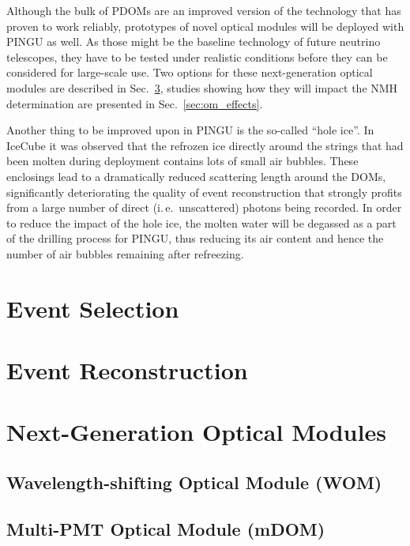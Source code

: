 Although the bulk of PDOMs are an improved version of the technology that has 
proven to work reliably, prototypes of novel optical modules will be deployed 
with PINGU as well. As those might be the baseline technology of future 
neutrino telescopes, they have to be tested under realistic conditions before 
they can be considered for large-scale use. Two options for these 
next-generation optical modules are described in Sec.~\ref{sec:Gen2DOM}, 
studies showing how they will impact the NMH determination are presented in 
Sec.~\ref{sec:om_effects}.

Another thing to be improved upon in PINGU is the so-called ``hole ice''. In 
IceCube it was observed that the refrozen ice directly around the strings that 
had been molten during deployment contains lots of small air bubbles. These 
enclosings 
lead to a dramatically reduced scattering length 
around the DOMs, significantly deteriorating the quality of event 
reconstruction that strongly profits from a large number of direct (i.\,e.\ 
unscattered) photons being recorded. In order to reduce the impact of the hole 
ice, the molten water will be degassed as a part of the drilling process for 
PINGU, thus reducing its air content and hence the number of air bubbles 
remaining after refreezing.

\section{Event Selection}
\label{sec:EvtSel}


\section{Event Reconstruction}
\label{sec:EvtReco}


\section{Next-Generation Optical Modules}
\label{sec:Gen2DOM}

\subsection{Wavelength-shifting Optical Module (WOM)}
\label{sec:WOM}


\subsection{Multi-PMT Optical Module (mDOM)}
\label{sec:mDOM}